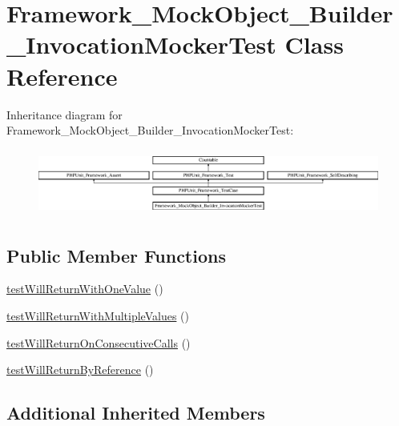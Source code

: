 \hypertarget{class_framework___mock_object___builder___invocation_mocker_test}{}\section{Framework\+\_\+\+Mock\+Object\+\_\+\+Builder\+\_\+\+Invocation\+Mocker\+Test Class Reference}
\label{class_framework___mock_object___builder___invocation_mocker_test}
Inheritance diagram for Framework\+\_\+\+Mock\+Object\+\_\+\+Builder\+\_\+\+Invocation\+Mocker\+Test\+:\begin{figure}[H]
\begin{center}
\leavevmode
\includegraphics[height=2.222222cm]{class_framework___mock_object___builder___invocation_mocker_test}
\end{center}
\end{figure}
\subsection*{Public Member Functions}
\begin{DoxyCompactItemize}
\item 
\mbox{\hyperlink{class_framework___mock_object___builder___invocation_mocker_test_a33b3f8d8e3c66a1d7a555250b90267e2}{test\+Will\+Return\+With\+One\+Value}} ()
\item 
\mbox{\hyperlink{class_framework___mock_object___builder___invocation_mocker_test_ae5333283c45f8fadd59382634f8bd7a0}{test\+Will\+Return\+With\+Multiple\+Values}} ()
\item 
\mbox{\hyperlink{class_framework___mock_object___builder___invocation_mocker_test_aa72e1246f470a960e73373ffbab8f090}{test\+Will\+Return\+On\+Consecutive\+Calls}} ()
\item 
\mbox{\hyperlink{class_framework___mock_object___builder___invocation_mocker_test_a77e83a070eb1b1b60d6b71725aa4d094}{test\+Will\+Return\+By\+Reference}} ()
\end{DoxyCompactItemize}
\subsection*{Additional Inherited Members}


